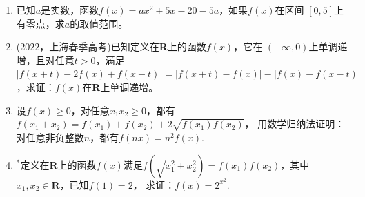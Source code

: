 \begin{enumerate}[label={\textbf{\thechapter.\arabic*}},leftmargin=
    \inteval{\myenumleftmargin}pt]
\item 已知$ a $是实数，函数$ f(x)=ax^2+5x−20-5a $，如果$ f(x) $在区间
$ [0,5] $上有零点，求$ a $的取值范围。

\item (2022，上海春季高考)已知定义在\textbf{R}上的函数$ f(x) $，它在
$ (-\infty,0) $上单调递增，且对任意$ t>0 $，满足$ |f(x+t)-2f(x)+f(x-t)|
=|f(x+t)-f(x)|-|f(x)-f(x-t)| $，求证：$ f(x) $在\textbf{R}上单调递增。 

\item 设$ f(x)\geq 0 $，对任意$ x_1x_2\geq 0 $，都有
$ f(x_1+x_2)=f(x_1)+f(x_2)+2\sqrt{f(x_1)f(x_2)} $，
用数学归纳法证明：对任意非负整数$ n $，都有$ f(nx)=n^2f(x) $.

\item $ ^* $定义在\textbf{R}上的函数$ f(x) $满足$ f(\sqrt{x_1^2+x_2^2})= 
f(x_1)f(x_2) $，其中$ x_1,x_2\in \textbf{R} $，已知$ f(1)=2 $，
求证：$ f(x)=2^{x^2} $.

\end{enumerate}

